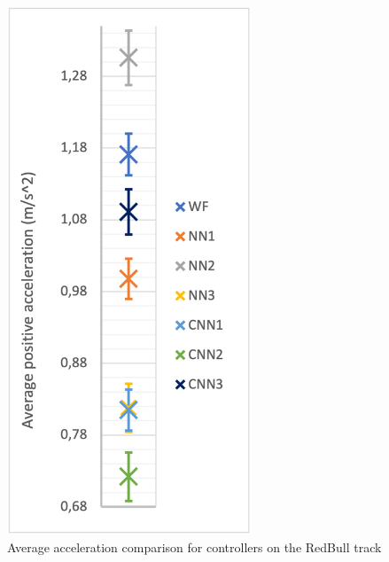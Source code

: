 \begin{figure}
    \centering
    \begin{minipage}{0.45\textwidth}
        \centering
        \includegraphics[width=0.65\textwidth]{Figures/H1_accel.png}
        \caption{Average acceleration comparison for controllers on the RedBull track}
        \label{h1_accel}
    \end{minipage}\hfill
    \begin{minipage}{0.45\textwidth}
        \centering

\end{minipage}
\end{figure}
